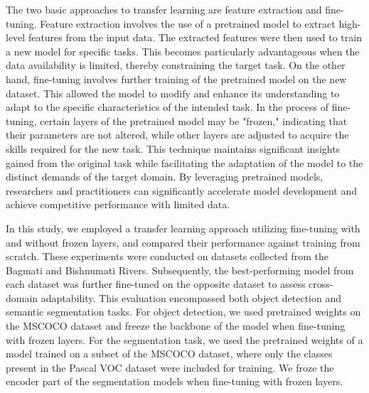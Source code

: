 \documentclass{ieeeaccess}
\begin{document}
The two basic approaches to transfer learning are feature extraction and fine-tuning. Feature extraction involves the use of a pretrained model to extract high-level features from the input data. The extracted features were then used to train a new model for specific tasks. This becomes particularly advantageous when the data availability is limited, thereby constraining the target task. On the other hand, fine-tuning involves further training of the pretrained model on the new dataset. This allowed the model to modify and enhance its understanding to adapt to the specific characteristics of the intended task. In the process of fine-tuning, certain layers of the pretrained model may be "frozen," indicating that their parameters are not altered, while other layers are adjusted to acquire the skills required for the new task. This technique maintains significant insights gained from the original task while facilitating the adaptation of the model to the distinct demands of the target domain. By leveraging pretrained models, researchers and practitioners can significantly accelerate model development and achieve competitive performance with limited data.

In this study, we employed a transfer learning approach utilizing fine-tuning with and without frozen layers, and compared their performance against training from scratch. These experiments were conducted on datasets collected from the Bagmati and Bishnumati Rivers. Subsequently, the best-performing model from each dataset was further fine-tuned on the opposite dataset to assess cross-domain adaptability. This evaluation encompassed both object detection and semantic segmentation tasks. For object detection, we used pretrained weights on the MSCOCO \cite{Lin2014MicrosoftCC} dataset and freeze the backbone of the model when fine-tuning with frozen layers. For the segmentation task, we used the pretrained weights of a model trained on a subset of the MSCOCO dataset, where only the classes present in the Pascal VOC \cite{pascalvoc} dataset were included for training. We froze the encoder part of the segmentation models when fine-tuning with frozen layers.

\end{document}
